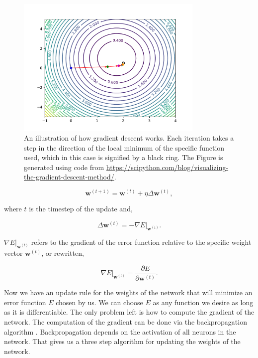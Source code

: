 \begin{figure}
    \centering
    \includegraphics[width=0.8\textwidth]{./pictures/method/gradient_descend}
    \caption{An illustration of how gradient descent works. Each iteration takes
        a step in the direction of the local minimum of the specific function
        used, which in this case is signified by a black ring. The Figure is
        generated using code from
        \url{https://scipython.com/blog/visualizing-the-gradient-descent-method/}.}
    \label{fig:gradient_descent}
\end{figure}

\begin{equation} \label{eq:gradient_descent_network_update}
    \mathbf{w}^{(t+1)} = \mathbf{w}^{(t)} + \eta \Delta \mathbf{w}^{(t)},
\end{equation}

where $t$ is the timestep of the update and,

\begin{equation}
    \Delta \mathbf{w}^{(t)} = -\nabla E|_{\mathbf{w}^{(t)}}.
\end{equation}

$\nabla E|_{\mathbf{w}^{(t)}}$ refers to the gradient of the error function
relative to the specific weight vector $\mathbf{w}^{(t)}$, or rewritten,

\begin{equation}
    \nabla E|_{\mathbf{w}^{(t)}} = \frac{\partial E}{\partial \mathbf{w}^{(t)}}.
\end{equation}

Now we have an update rule for the weights of the network that will minimize an
error function $E$ chosen by us. We can choose $E$ as any function we desire
as long as it is differentiable. The only problem left is how to compute the
gradient of the network. The computation of the gradient can be done via the
backpropagation algorithm \citep{Bishop}. Backpropagation depends on the
activation of all neurons in the network. That gives us a three step algorithm
for updating the weights of the network.

